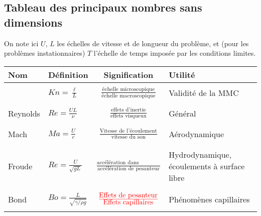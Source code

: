 \begin{landscape}

\section{Tableau des principaux nombres sans dimensions}

On note ici $U$, $L$ les échelles de vitesse et de longueur du problème, et (pour les problèmes instationnaires) $T$ l'échelle de temps imposée par les conditions limites.

\vspace{.5cm}

\begin{tabular}{|l   |l    |c    |l   |}
\hline
Nom & Définition & Signification & Utilité \\
\hline 
\hline
&&&\\
\color{red}{Knudsen} & 
$Kn = \frac{\ell}{L}$ & 
$\displaystyle\frac{ \mbox{échelle microscopique}}{ \mbox{échelle macroscopique}}$ &
Validité de la MMC
\\
&&&\\
\hline
&&&\\
Reynolds & $Re = \frac{U L}{\nu} $& 
$\displaystyle\frac{ \mbox{effets d'inertie}}{ \mbox{effets visqueux}}$ &
Général
\\
&&&\\
\hline
&&&\\
Mach & $Ma = \frac{U }{c}$ & 
$\displaystyle\frac{ \mbox{Vitesse de l'écoulement}}{ \mbox{vitesse du son}}$ &
Aérodynamique
\\
&&&\\
\hline
&&&\\
Froude & $Re = \frac{U }{\sqrt{gL}}$ & 
 $\displaystyle \frac{ \mbox{accélération dans l'écoulement}}{ \mbox{accélération de pesanteur}}$ &
Hydrodynamique, écoulements à surface libre
\\
&&&\\
\hline
&&&\\
Bond
  & $Bo = \frac{L}{\sqrt{\gamma/\rho g}}$  & 
$\color{red}{\frac{ \mbox{Effets de pesanteur}}{ \mbox{Effets capillaires}}}$ &
Phénomènes capillaires
\\
\color{red}{(ou E\"otv\"os)} &&&\\

\end{tabular}
\end{landscape}
